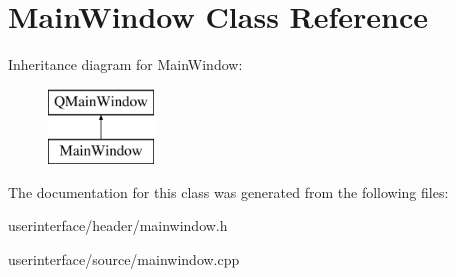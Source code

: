 \section{Main\-Window Class Reference}
\label{class_main_window}
Inheritance diagram for Main\-Window\-:\begin{figure}[H]
\begin{center}
\leavevmode
\includegraphics[height=2.000000cm]{class_main_window}
\end{center}
\end{figure}


The documentation for this class was generated from the following files\-:\begin{DoxyCompactItemize}
\item 
userinterface/header/mainwindow.\-h\item 
userinterface/source/mainwindow.\-cpp\end{DoxyCompactItemize}
